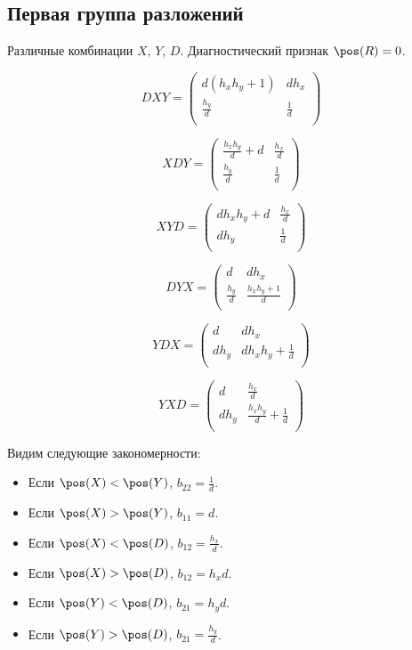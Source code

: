 \subsection{Первая группа разложений}

Различные комбинации $X$, $Y$, $D$.
Диагностический признак $\pos(R)=0$.

$$DXY =
 \begin{pmatrix} d \left(
 h_x h_y + 1 \right) & d h_x \\
\displaystyle\frac{h_y}{
 d} & \displaystyle\frac{1}{d} \\
 \end{pmatrix} $$
 
$$XDY =
 \begin{pmatrix} \displaystyle\frac{
 h_x h_y}{d} + d & \displaystyle\frac{h_x}{d} \\
\displaystyle\frac{
 h_y}{d} & \displaystyle\frac{1}{d} \\
 \end{pmatrix} $$

$$XYD =
 \begin{pmatrix} d
 h_x h_y + d & \displaystyle\frac{h_x}{d} \\
d h_y & \displaystyle\frac{1
 }{d} \\
\end{pmatrix} $$

$$DYX =
 \begin{pmatrix} d & d
 h_x \\
\displaystyle\frac{h_y}{d} & \displaystyle\frac{h_x h_y + 1
 }{d} \\
\end{pmatrix} $$


$$YDX =
 \begin{pmatrix} d & d
 h_x \\
d h_y & d h_x h_y + \displaystyle\frac{1}{d}
 \\
\end{pmatrix} $$

$$YXD =
 \begin{pmatrix} d & \displaystyle\frac{
 h_x}{d} \\
d h_y & \displaystyle\frac{h_x h_y
 }{d} + \displaystyle\frac{1}{d} \\
 \end{pmatrix} $$

Видим следующие закономерности:

\begin{itemize}
	\item Если $\pos(X)<\pos(Y)$, $b_{22} = \frac{1}{d}$.
	\item Если $\pos(X)>\pos(Y)$, $b_{11} = d$.
	\item Если $\pos(X)<\pos(D)$, $b_{12} = \frac{h_x}{d}$.
	\item Если $\pos(X)>\pos(D)$, $b_{12} = h_x d$.
	\item Если $\pos(Y)<\pos(D)$, $b_{21} = h_y d$.
	\item Если $\pos(Y)>\pos(D)$, $b_{21} = \frac{h_y}{d}$.
\end{itemize}

